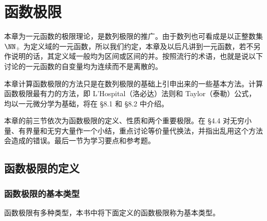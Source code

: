 \chapter{函数极限}


本章为一元函数的极限理论，是数列极限的推广。由于数列也可看成是以正整数集 $\NN_+$ 为定义域的一元函数，所以我们约定，本章及以后凡讲到一元函数，若不另作说明的话，其定义域一般均为区间或区间的并。按照流行的术语，也就是说以下讨论的一元函数的自变量均为连续而不是离散的。

本章计算函数极限的方法只是在数列极限的基础上引申出来的一些基本方法。计算函数极限最有力的方法，即 L'Hospital（洛必达）法则和 Taylor（泰勒）公式，均以一元微分学为基础，将在 §8.1 和 §8.2 中介绍。

本章的前三节依次为函数极限的定义、性质和两个重要极限。在 §4.4 对无穷小量、有界量和无穷大量作一个小结，重点讨论等价量代换法，并指出乱用这个方法会造成的错误。最后一节为学习要点和参考题。

\section{函数极限的定义}

\subsection{函数极限的基本类型}

函数极限有多种类型，本书中将下面定义的函数极限称为基本类型。

